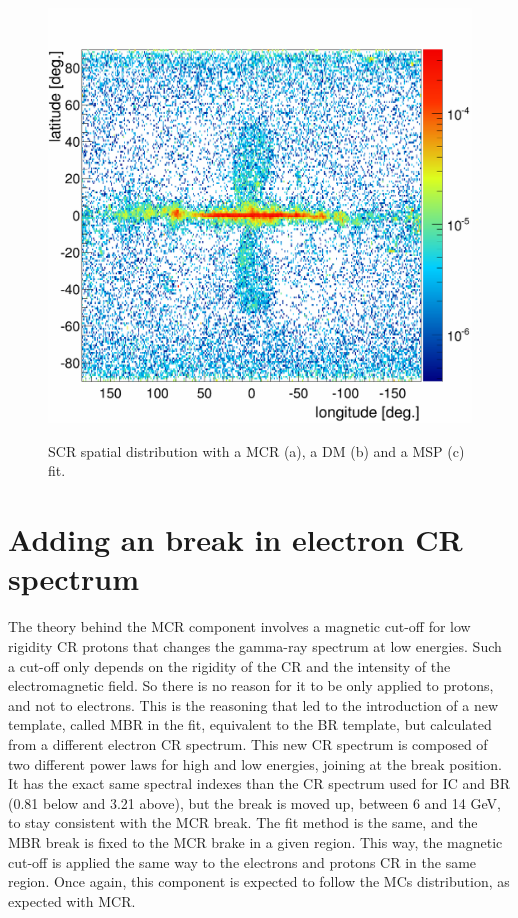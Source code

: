 \begin{figure}[h]
\begin{minipage}[h]{0.45\textwidth}
	  \label{}
  \end{minipage}
  \hfill
  \begin{minipage}[h]{0.45\textwidth}
	  \centering
	  \includegraphics[width=1.\linewidth]{pic/discussion/MSPonly_fine_SCR_integral_distribution.png}
	  \label{}
  \end{minipage}
  \caption[SCR spatial distributions.]{SCR spatial distribution with a MCR (a), a DM (b) and a MSP (c) fit.}
  \label{fig:SCR_flux_distrib_excess_comp}	 
\end{figure}



\newpage
\section{Adding an break in electron CR spectrum}

The theory behind the MCR component involves a magnetic cut-off for low rigidity CR protons that changes the gamma-ray spectrum at low energies. Such a cut-off only depends on the rigidity of the CR and the intensity of the electromagnetic field. So there is no reason for it to be only applied to protons, and not to electrons. This is the reasoning that led to the introduction of a new template, called MBR in the fit, equivalent to the BR template, but calculated from a different electron CR spectrum.
This new CR spectrum is composed of two different power laws for high and low energies, joining at the break position. It has the exact same spectral indexes than the CR spectrum used for IC and BR (0.81 below and 3.21 above), but the break is moved up, between 6 and 14 GeV, to stay consistent with the MCR break. The fit method is the same, and the MBR break is fixed to the MCR brake in a given region. This way, the magnetic cut-off is applied the same way to the electrons and protons CR in the same region. Once again, this component is expected to follow the MCs distribution, as expected with MCR.

